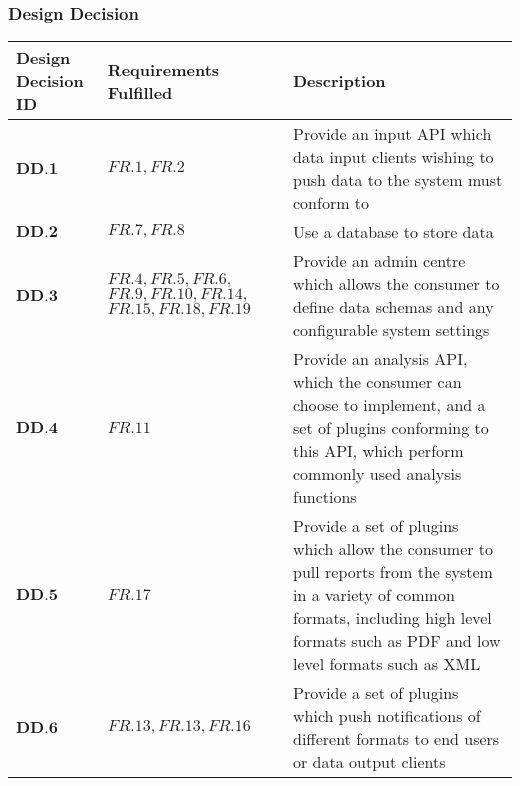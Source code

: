 \subsubsection{Design Decision}
\vspace{-0.5cm}
\begin{longtable}[H]{ | p{2cm} | p{3.5cm} | p{11cm} | }
		\hline
			\cellcolor{titleColor}\textbf{Design Decision ID}&	\cellcolor{titleColor}\textbf{Requirements Fulfilled}&	\cellcolor{titleColor}\textbf{Description}	\\ \hline
			$\textbf{DD.1}$&	$FR.1,FR.2$&	Provide an input API which data input clients wishing to push data to the system must conform to	\\ \hline
			$\textbf{DD.2}$&	$FR.7,FR.8$ &	Use a database to store data	\\ \hline
			$\textbf{DD.3}$ &	$FR.4,FR.5,FR.6, $
			$FR.9,FR.10,FR.14, $
			$FR.15,FR.18,FR.19$ &	Provide an admin centre which allows the consumer to define data schemas and any configurable system settings	\\ \hline
			$\textbf{DD.4}$&	$FR.11$&	Provide an analysis API, which the consumer can choose to implement, and a set of plugins conforming to this API, which perform commonly used analysis functions	\\ \hline
			$\textbf{DD.5}$&	$FR.17$ &	Provide a set of plugins which allow the consumer to pull reports from the system in a variety of common formats, including high level formats such as PDF and low level formats such as XML	\\ \hline
			$\textbf{DD.6}$&	$FR.13, FR.13, FR.16$ &	Provide a set of plugins which push notifications of different formats to end users or data output clients	\\ \hline
\end{longtable}
